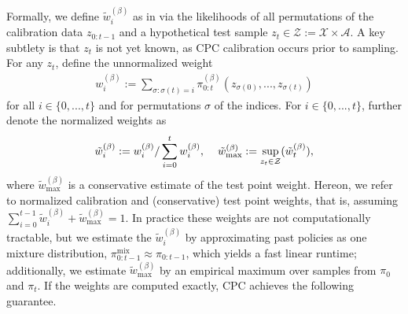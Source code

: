 Formally, we define $\tilde{w}_i^{(\beta)}$ as in \citet{prinster2024conformal} via the likelihoods of all permutations of the calibration data $z_{0:t-1}$ and a hypothetical test sample $z_t \in \mathcal{Z} := \mathcal{X} \times \mathcal{A}$. A key subtlety is that $z_t$ is not yet known, as CPC calibration occurs prior to sampling. For any $z_t$, define the unnormalized weight
\begin{align*}
    w_i^{(\beta)}:=\sum_{\sigma:\sigma(t)=i}\pi_{0:t}^{(\beta)}(z_{\sigma(0)}, ..., z_{\sigma(t)})
\end{align*}
for all $i\in\{0, ..., t\}$ and for permutations $\sigma$ of the indices. For $i\in\{0, ..., t\}$, further denote the normalized weights as
\begin{align*}
    \tilde{w}_i^{(\beta)}:= w_i^{(\beta)}/\sum_{i=0}^tw_i^{(\beta)}, \hspace{4mm}\tilde{w}_{\max}^{(\beta)}:=\sup_{z_t\in \mathcal{Z}}(\tilde{w}_t^{(\beta)}),
\end{align*}
where $\tilde{w}_{\max}^{(\beta)}$ is a conservative estimate of the test point weight.
Hereon, we refer to normalized calibration and (conservative) test point weights, that is, assuming $\sum_{i=0}^{t-1}\tilde{w}_{i}^{(\beta)}+\tilde{w}_{\max}^{(\beta)}=1$.
In practice these weights are not computationally tractable, but we estimate the $\tilde{w}_i^{(\beta)}$ by approximating past policies as one mixture distribution, $\pi_{0:t-1}^{\text{mix}}\approx \pi_{0:t-1}$, which yields a fast linear runtime; additionally, we estimate $\tilde{w}_{\max}^{(\beta)}$ by an empirical maximum over samples from $\pi_0$ and $\pi_t$. If the weights are computed exactly, CPC achieves the following guarantee.

